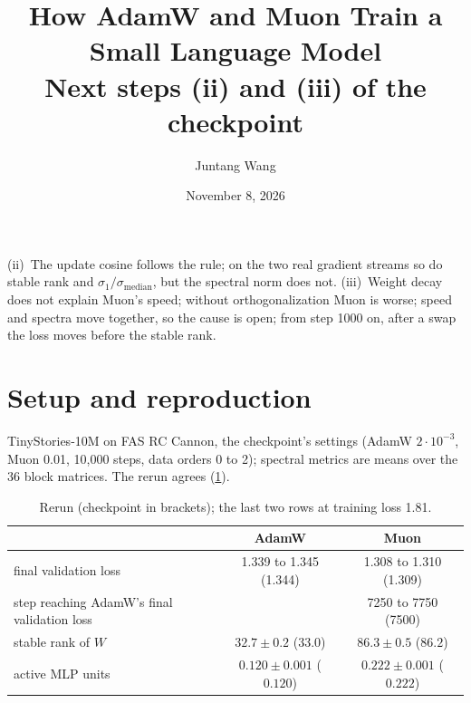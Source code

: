 \documentclass[10pt]{article}
\title{How AdamW and Muon Train a Small Language Model\\[1pt]
\normalfont Next steps (ii) and (iii) of the checkpoint}
\author{Juntang Wang}
\date{November 8, 2026}
\makeatletter
\renewcommand\paragraph{\@startsection{paragraph}{4}{\z@}{1.0ex \@plus .3ex \@minus .2ex}{-1em}{\normalfont\normalsize\bfseries}}
\renewcommand\maketitle{\begin{center}{\large\bfseries\@title\par}\vspace{3pt}\@author\quad\textperiodcentered\quad\@date\end{center}}
\makeatother
\begin{document}
\maketitle
\vspace{-0.8em}

\paragraph{Summary.} (ii)~The update cosine follows the rule; on the two real gradient streams so do stable rank and $\sigma_1/\sigma_{\mathrm{median}}$, but the spectral norm does not. (iii)~Weight decay does not explain Muon's speed; without orthogonalization Muon is worse; speed and spectra move together, so the cause is open; from step 1000 on, after a swap the loss moves before the stable rank.

\section{Setup and reproduction}
\label{sec:setup}

TinyStories-10M on FAS RC Cannon, the checkpoint's settings (AdamW $2\cdot10^{-3}$, Muon 0.01, 10{,}000 steps, data orders 0 to 2); spectral metrics are means over the 36 block matrices. The rerun agrees (\cref{tab:repro}).

\begin{table}[H]
\centering
\small
\caption{Rerun (checkpoint in brackets); the last two rows at training loss 1.81.}
\label{tab:repro}
\begin{tabular}{l cc}
\toprule
 & AdamW & Muon \\
\midrule
final validation loss & 1.339 to 1.345 (1.344) & 1.308 to 1.310 (1.309) \\
step reaching AdamW's final validation loss & & 7250 to 7750 (7500) \\
stable rank of $W$ & $32.7 \pm 0.2$ ($33.0$) & $86.3 \pm 0.5$ ($86.2$) \\
active MLP units & $0.120 \pm 0.001$ ($0.120$) & $0.222 \pm 0.001$ ($0.222$) \\
\bottomrule
\end{tabular}
\end{table}

\end{document}
